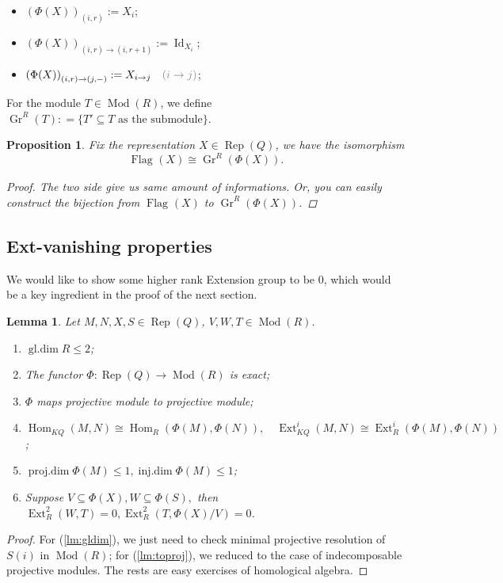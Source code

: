 \documentclass[reqno,11pt]{amsart}
\numberwithin{equation}{section}
\theoremstyle{plain}
\newtheorem{lemma}[theorem]{Lemma}
\newtheorem{proposition}[theorem]{Proposition}
\theoremstyle{plain}
\numberwithin{equation}{section}
\theoremstyle{remark}
\DeclareMathOperator{\Id}{\operatorname{Id}}
\DeclareMathOperator{\Rep}{\operatorname{Rep}}
\DeclareMathOperator{\Mod}{\operatorname{Mod}}
\DeclareMathOperator{\Hom}{\operatorname{Hom}}
\DeclareMathOperator{\Ext}{\operatorname{Ext}}
\DeclareMathOperator{\gldim}{\operatorname{gl.dim}}
\DeclareMathOperator{\projdim}{\operatorname{proj.dim}}
\DeclareMathOperator{\injdim}{\operatorname{inj.dim}}
\newcommand{\Grr}{\operatorname{Gr}^{R}}
\newcommand{\Flag}[1]{\operatorname{Flag}_{\mathbf{#1}}}
\begin{document}
\begin{itemize}
\item $\left(\Phi(X)\right)_{(i,r)}:=X_i$;
\item $\left(\Phi(X)\right)_{(i,r) \rightarrow (i,r+1)}:=\Id_{X_i}$;
\item $\left(\Phi(X)\right)_{(i,r) \rightarrow (j,-)}:=X_{i \rightarrow j} \textcolor{gray}{ \quad(i \rightarrow j)}$;
\end{itemize}
For the module $T \in \Mod(R)$, we define $\Grr(T)\colon=\{T' \subseteq T \text{ as the submodule}  \}$.
\begin{proposition}
Fix the representation $X\in \Rep(Q)$, we have the isomorphism
$$\Flag{}(X)\cong \Grr(\Phi(X)).$$
\begin{proof}
The two side give us same amount of informations. Or, you can easily construct the bijection from $\Flag{}(X)$ to $\Grr(\Phi(X))$.
\end{proof}
\end{proposition}
\subsection{Ext-vanishing properties}
We would like to show some higher rank Extension group to be 0, which would be a key ingredient in the proof of the next section.

\begin{lemma}\label{lm:Extvan}
Let $M,N,X,S \in \Rep(Q)$, $V,W,T \in \Mod(R)$.
\begin{enumerate}[(1)]
	\item $\gldim R \leqslant 2$;\label{lm:gldim}
	\item The functor $\Phi:\Rep(Q) \longrightarrow \Mod(R)$ is exact;
	\item $\Phi$ maps projective module to projective module;\label{lm:toproj}
	\item $\Hom_{KQ}(M,N) \cong \Hom_{R}(\Phi(M),\Phi(N)),\quad\Ext^i_{KQ}(M,N) \cong \Ext^i_{R}(\Phi(M),\Phi(N))$;
	\item $\projdim \Phi(M) \leqslant 1, \injdim \Phi(M) \leqslant 1$;
	\item Suppose $V \subseteq \Phi(X), W \subseteq \Phi(S),$ then $\Ext^2_{R}(W,T)=0, \Ext^2_{R}(T,\Phi(X)/V)=0$.\label{lm:Ext2van}
\end{enumerate}
\end{lemma}
\begin{proof}
For (\ref{lm:gldim}), we just need to check minimal projective resolution of $S(i)$ in $\Mod(R)$; for (\ref{lm:toproj}), we reduced to the case of indecomposable projective modules. The rests are easy exercises of homological algebra.
\end{proof}
\end{document}
